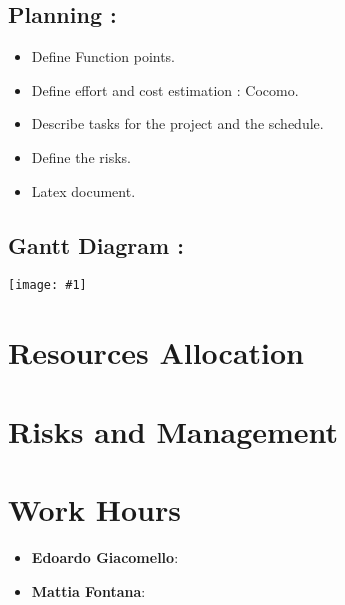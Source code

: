 \documentclass[11pt, a4paper,titlepage]{article}
\newcommand{\image}[1]{
	\begin{center}
		\noindent \texttt{[image: \#1]}
	\end{center}
}
\begin{document}
	\subsection{Planning :}
	\begin{itemize}
		\item Define Function points.
		\item Define effort and cost estimation : Cocomo.
		\item Describe tasks for the project and the schedule.
		\item Define the risks.
		\item Latex document.
	\end{itemize}
	
	\subsection{Gantt Diagram :}
	\image{ganttdiagramm.png}
	\section{Resources Allocation}
	\section{Risks and Management}

	\section{Work Hours}
		\begin{itemize}
			\item \textbf{Edoardo Giacomello}: 
			\item \textbf{Mattia Fontana}: 
		\end{itemize}	
\end{document}
